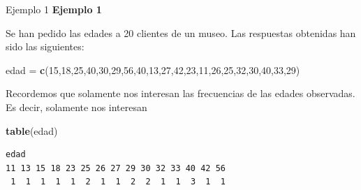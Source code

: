 \documentclass[
  ignorenonframetext,
  aspectratio=169]{beamer}
\newenvironment{Shaded}{\begin{snugshade}}{\end{snugshade}}
\newcommand{\DecValTok}[1]{\textcolor[rgb]{0.00,0.00,0.81}{#1}}
\newcommand{\FunctionTok}[1]{\textcolor[rgb]{0.13,0.29,0.53}{\textbf{#1}}}
\newcommand{\NormalTok}[1]{#1}
\newcommand{\OtherTok}[1]{\textcolor[rgb]{0.56,0.35,0.01}{#1}}
\begin{document}
\begin{frame}[fragile]{Ejemplo 1}
\label{ejemplo-1-4}
\textbf{Ejemplo 1}

Se han pedido las edades a 20 clientes de un museo. Las respuestas
obtenidas han sido las siguientes:

\begin{Shaded}
\begin{Highlighting}[]
\NormalTok{edad }\OtherTok{=} \FunctionTok{c}\NormalTok{(}\DecValTok{15}\NormalTok{,}\DecValTok{18}\NormalTok{,}\DecValTok{25}\NormalTok{,}\DecValTok{40}\NormalTok{,}\DecValTok{30}\NormalTok{,}\DecValTok{29}\NormalTok{,}\DecValTok{56}\NormalTok{,}\DecValTok{40}\NormalTok{,}\DecValTok{13}\NormalTok{,}\DecValTok{27}\NormalTok{,}\DecValTok{42}\NormalTok{,}\DecValTok{23}\NormalTok{,}\DecValTok{11}\NormalTok{,}\DecValTok{26}\NormalTok{,}\DecValTok{25}\NormalTok{,}\DecValTok{32}\NormalTok{,}\DecValTok{30}\NormalTok{,}\DecValTok{40}\NormalTok{,}\DecValTok{33}\NormalTok{,}\DecValTok{29}\NormalTok{)}
\end{Highlighting}
\end{Shaded}

Recordemos que solamente nos interesan las frecuencias de las edades
observadas. Es decir, solamente nos interesan

\begin{Shaded}
\begin{Highlighting}[]
\FunctionTok{table}\NormalTok{(edad)}
\end{Highlighting}
\end{Shaded}

\begin{verbatim}
edad
11 13 15 18 23 25 26 27 29 30 32 33 40 42 56 
 1  1  1  1  1  2  1  1  2  2  1  1  3  1  1 
\end{verbatim}
\end{frame}
\end{document}
